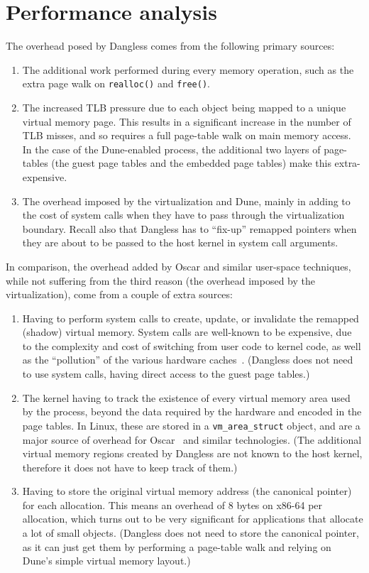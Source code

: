 \section{Performance analysis}

The overhead posed by Dangless comes from the following primary sources:

\begin{enumerate}
	\item The additional work performed during every memory operation, such as the extra page walk on \lstinline!realloc()! and \lstinline!free()!.
	\item The increased TLB pressure due to each object being mapped to a unique virtual memory page. This results in a significant increase in the number of TLB misses, and so requires a full page-table walk on main memory access. In the case of the Dune-enabled process, the additional two layers of page-tables (the guest page tables and the embedded page tables) make this extra-expensive.
	\item The overhead imposed by the virtualization and Dune, mainly in adding to the cost of system calls when they have to pass through the virtualization boundary. Recall also that Dangless has to ``fix-up'' remapped pointers when they are about to be passed to the host kernel in system call arguments.
\end{enumerate}

In comparison, the overhead added by Oscar and similar user-space techniques, while not suffering from the third reason (the overhead imposed by the virtualization), come from a couple of extra sources:

\begin{enumerate}
	\item Having to perform system calls to create, update, or invalidate the remapped (shadow) virtual memory. System calls are well-known to be expensive, due to the complexity and cost of switching from user code to kernel code, as well as the ``pollution'' of the various hardware caches~\cite{flexsc2010-syscalls}. (Dangless does not need to use system calls, having direct access to the guest page tables.)
	\item The kernel having to track the existence of every virtual memory area used by the process, beyond the data required by the hardware and encoded in the page tables. In Linux, these are stored in a \lstinline!vm_area_struct! object, and are a major source of overhead for Oscar~\cite{oscar2017} and similar technologies. (The additional virtual memory regions created by Dangless are not known to the host kernel, therefore it does not have to keep track of them.)
	\item Having to store the original virtual memory address (the canonical pointer) for each allocation. This means an overhead of 8 bytes on x86-64 per allocation, which turns out to be very significant for applications that allocate a lot of small objects. (Dangless does not need to store the canonical pointer, as it can just get them by performing a page-table walk and relying on Dune's simple virtual memory layout.)
\end{enumerate}

